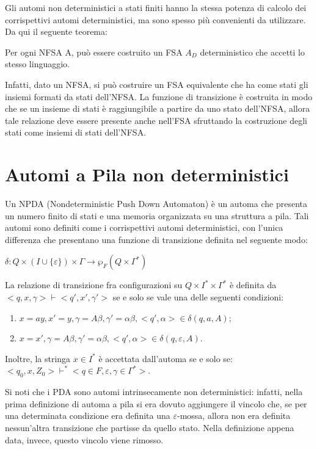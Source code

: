   Gli automi non deterministici a stati finiti hanno la stessa potenza di calcolo dei corrispettivi automi deterministici, ma sono spesso più convenienti da utilizzare. Da qui il seguente teorema:

  \begin{theorem}
    Per ogni NFSA A, può essere costruito un FSA \(A_D\) deterministico che accetti lo stesso linguaggio. 
  \end{theorem}

  Infatti, dato un NFSA, si può costruire un FSA equivalente che ha come stati gli insiemi formati da stati dell'NFSA. La funzione di transizione è costruita in modo che se un insieme di stati è raggiungibile a partire da uno stato dell'NFSA, allora tale relazione deve essere presente anche nell'FSA sfruttando la costruzione degli stati come insiemi di stati dell'NFSA. 

  \vspace{1in}
  \section{Automi a Pila non deterministici}
  Un NPDA (Nondeterministic Push Down Automaton) è un automa che presenta un numero finito di stati  e una memoria organizzata su una struttura a pila. Tali automi sono definiti come i corrispettivi automi deterministici, con l'unica differenza che presentano una funzione di transizione definita nel seguente modo:

  \(\delta:Q\times (I\cup \{\varepsilon\})\times \Gamma \to \wp_F(Q\times\Gamma^*)\)

  La relazione di transizione fra configurazioni su \(Q\times I^*\times \Gamma^*\) è definita da \(<q,x,\gamma> \vdash <q',x',\gamma'>\) se e solo se vale una delle seguenti condizioni:
  \begin{enumerate}
    \item \(x=ay, x'=y, \gamma=A\beta, \gamma'=\alpha\beta, <q',\alpha>\in\delta(q, a, A)\);
    \item \(x=x', \gamma=A\beta, \gamma'=\alpha\beta, <q',\alpha>\in \delta(q,\varepsilon,A)\).
  \end{enumerate}  

  \noindent
  Inoltre, la stringa \(x\in I^*\) è accettata dall'automa se e solo se:\\
  \(<q_0, x,Z_0>\vdash^*<q\in F, \varepsilon, \gamma\in \Gamma^*>\).

  Si noti che i PDA sono automi intrinsecamente non deterministici: infatti, nella prima definizione di automa a pila si era dovuto aggiungere il vincolo che, se per una determinata condizione era definita una \(\varepsilon\)-mossa, allora non era definita nessun'altra transizione che partisse da quello stato. Nella definizione appena data, invece, questo vincolo viene rimosso.

